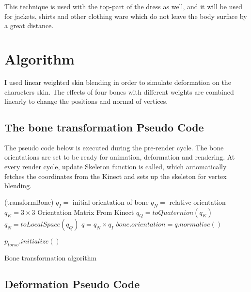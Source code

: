 This technique is used with the top-part of the dress as well, and it will be used for jackets, shirts and other clothing ware which do not leave the body surface by a great distance. 

\section{Algorithm}
\label{section5_3}

I used linear weighted skin blending \cite{Kavan2003} in order to simulate deformation on the characters skin. The effects of four bones with different weights are combined linearly to change the positions and normal of vertices.

\subsection{The bone transformation Pseudo Code}

The pseudo code below is executed during the pre-render cycle. The bone
orientations are set to be ready for animation, deformation and rendering. At
every render cycle, update Skeleton function is called, which automatically
fetches the coordinates from the Kinect and sets up the skeleton for vertex
blending. 

\begin{algorithm}
\dontprintsemicolon %
\function(transformBone){
$q_I =$ initial orientation of bone\;
$q_N =$ relative orientation\;
$q_K = 3\times3$ Orientation Matrix From Kinect\;
 {
  $q_Q = toQuaternion(q_K)$\;
  $q_N = toLocalSpace(q_Q)$\;
  $q = q_N \times q_I$\;
  $bone.orientation=q.normalise{\left(\right)}$\; }}

 {
  $p_{torso}.initialize()$  \;
 }
\caption{Bone transformation algorithm}
\label{algo:transformBone}
\end{algorithm}

\subsection{Deformation Pseudo Code}

